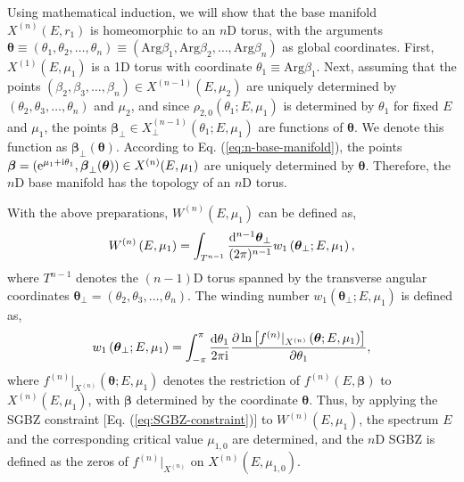 Using mathematical induction, we will show that the base manifold
$X^{(n)}(E,r_{1})$ is homeomorphic to an $n$D torus, with the arguments
$\boldsymbol{\theta}\equiv(\theta_{1},\theta_{2},\dots,\theta_{n})\equiv(\text{Arg}\beta_{1},\text{Arg}\beta_{2},\dots,\text{Arg}\beta_{n})$
as global coordinates. First, $X^{(1)}(E,\mu_{1})$ is a 1D torus
with coordinate $\theta_{1}\equiv\text{Arg}\beta_{1}$. Next, assuming
that the points $(\beta_{2},\beta_{3},\dots,\beta_{n})\in X^{(n-1)}(E,\mu_{2})$
are uniquely determined by $(\theta_{2},\theta_{3},\dots,\theta_{n})$
and $\mu_{2}$, and since $\rho_{2,0}(\theta_{1};E,\mu_{1})$  is determined
by $\theta_{1}$ for fixed $E$ and $\mu_{1}$, the points $\boldsymbol{\beta}_{\perp}\in X_{\perp}^{(n-1)}(\theta_{1};E,\mu_{1})$
are functions of $\boldsymbol{\theta}$. We denote this function as
$\boldsymbol{\beta}_{\perp}(\boldsymbol{\theta})$. According to Eq.
(\ref{eq:n-base-manifold}), the points $\boldsymbol{\beta}=(\mathrm{e}^{\mu_{1}+\mathrm{i}\theta_{1}},\boldsymbol{\beta}_{\perp}(\boldsymbol{\theta}))\in X^{(n)}(E,\mu_{1})$
are uniquely determined by $\boldsymbol{\theta}$. Therefore, the
$n$D base manifold has the topology of an $n$D torus.

With the above preparations, $W^{(n)}(E,\mu_{1})$ can be
defined as, 
\begin{equation}
W^{(n)}\left(E,\mu_{1}\right)=\int_{T^{n-1}}\frac{\mathrm{d}^{n-1}\boldsymbol{\theta}_{\perp}}{(2\pi)^{n-1}}w_{1}\left(\boldsymbol{\theta}_{\perp};E,\mu_{1}\right),
\end{equation}
where $T^{n-1}$ denotes the $(n-1)$D torus spanned by the transverse
angular coordinates $\boldsymbol{\theta}_{\perp}=(\theta_{2},\theta_{3},\dots,\theta_{n})$.
The winding number $w_{1}(\boldsymbol{\theta}_{\perp};E,\mu_{1})$
is defined as, 
\begin{equation}
w_{1}\left(\boldsymbol{\theta}_{\perp};E,\mu_{1}\right)=\int_{-\pi}^{\pi}\frac{\mathrm{d}\theta_{1}}{2\pi\mathrm{i}}\frac{\partial\ln\left[f^{(n)}|_{X^{(n)}}\left(\boldsymbol{\theta};E,\mu_{1}\right)\right]}{\partial\theta_{1}},\label{eq:w-loop-nD}
\end{equation}
where $f^{(n)}|_{X^{(n)}}(\boldsymbol{\theta};E,\mu_{1})$ denotes
the restriction of $f^{(n)}(E,\boldsymbol{\beta})$ to $X^{(n)}(E,\mu_{1})$,
with $\boldsymbol{\beta}$ determined by the coordinate $\boldsymbol{\theta}$.
Thus, by applying the SGBZ constraint {[}Eq. (\ref{eq:SGBZ-constraint}){]}
to $W^{(n)}(E,\mu_{1})$, the spectrum $E$ and the corresponding
critical value $\mu_{1,0}$ are determined, and the $n$D SGBZ is
defined as the zeros of $f^{(n)}|_{X^{(n)}}$ on $X^{(n)}(E,\mu_{1,0})$.

